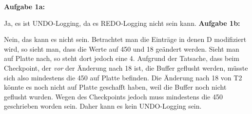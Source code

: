 \documentclass[12pt]{article}
\begin{document}
\noindent 
\textbf{Aufgabe 1a: } 

\noindent
Ja, es ist UNDO-Logging, da es REDO-Logging nicht sein kann.
\newline
\textbf{Aufgabe 1b: } 

\noindent Nein, das kann es nicht sein. Betrachtet man die Einträge in denen D modifiziert wird,
					  so sieht man, dass die Werte auf 450 und 18 geändert werden. Sieht man auf Platte nach, so steht dort jedoch 
					  eine 4. Aufgrund der Tatsache, dass beim Checkpoint, der \textit{vor} der Änderung nach 18 ist, die Buffer geflusht werden, müsste sich also mindestens die 450 auf Platte befinden. Die Änderung nach 18 von T2 könnte
					  es noch nicht auf Platte geschafft haben, weil die Buffer noch nicht geflusht wurden. Wegen des Checkpoints jedoch muss mindestens die 450 geschrieben worden sein. Daher kann es kein UNDO-Logging sein.
\end{document}
